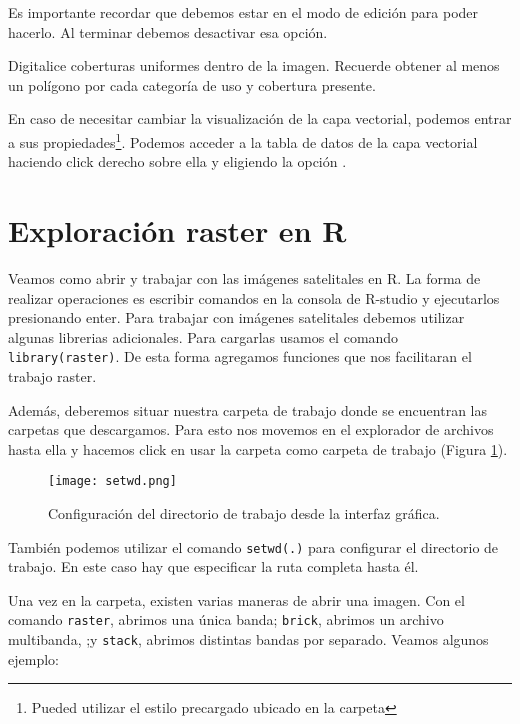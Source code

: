 Es importante recordar que debemos estar en el modo de edici\'on para poder hacerlo.
Al terminar debemos desactivar esa opci\'on.

\begin{act}
   Digitalice coberturas uniformes dentro de la imagen. Recuerde obtener al
   menos un pol\'igono por cada categor\'ia de uso y cobertura presente.
\end{act}

En caso de necesitar cambiar la visualizaci\'on de la capa vectorial, podemos entrar
a sus propiedades\footnote{Pueded utilizar el estilo precargado
ubicado en la carpeta }. Podemos acceder a la tabla de
datos de la capa vectorial haciendo click derecho sobre ella y eligiendo la
opci\'on .

\section{Exploraci\'on raster en R}

Veamos como abrir y trabajar con las im\'agenes satelitales en R. La forma de
realizar operaciones es escribir comandos en la consola de R-studio y
ejecutarlos presionando enter. Para trabajar con im\'agenes satelitales debemos utilizar
algunas librerias adicionales. Para cargarlas usamos el comando
\texttt{library(raster)}. De esta forma agregamos funciones que nos facilitaran
el trabajo raster.

Adem\'as, deberemos situar nuestra carpeta de trabajo donde se encuentran las
carpetas que descargamos. Para esto nos movemos en el explorador de archivos
hasta ella y hacemos click en usar la carpeta como carpeta de trabajo (Figura \ref{fig:setwd}).

\begin{figure}[h!]
\begin{center}
    \texttt{[image: setwd.png]}
\end{center}
\caption{Configuraci\'on del directorio de trabajo desde la interfaz gr\'afica.}
\label{fig:setwd}
\end{figure}

Tambi\'en podemos utilizar el comando \texttt{setwd(.)} para configurar el
directorio de trabajo. En este caso hay que especificar la ruta completa hasta
\'el.

Una vez en la carpeta, existen varias maneras de abrir una imagen. Con el comando
\texttt{raster}, abrimos una \'unica banda; \texttt{brick}, abrimos un archivo multibanda,
;y \texttt{stack}, abrimos distintas bandas por separado. Veamos algunos ejemplo:

